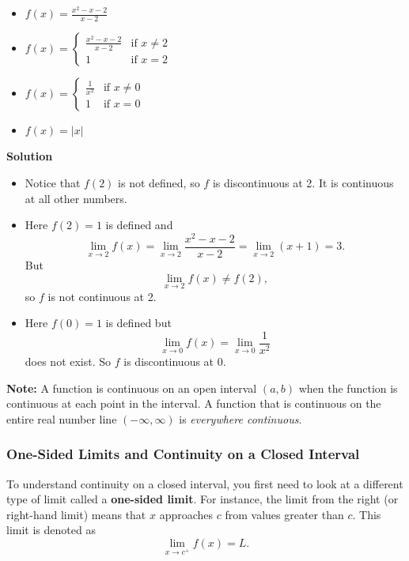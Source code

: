 \documentclass[12pt]{article}
\theoremstyle{beautifulthm}
\begin{document}
\begin{tcolorbox}[colback=examplebg, colframe=red!75!black, title=\textbf{EXAMPLE 1:Where are each of the following functions discontinuous?}, fonttitle=\bfseries, sharp corners]
\begin{itemize}
    \item[(a)] \( f(x) = \frac{x^2 - x - 2}{x - 2} \)
    \item[(b)] \( f(x) = \begin{cases} 
    \frac{x^2 - x - 2}{x - 2} & \text{if } x \neq 2 \\
    1 & \text{if } x = 2 
    \end{cases} \)
    \item[(c)] \( f(x) = \begin{cases} 
    \frac{1}{x^2} & \text{if } x \neq 0 \\
    1 & \text{if } x = 0 
    \end{cases} \)
    \item[(d)] \( f(x) = |x| \)
\end{itemize}

\tcblower
\textbf{Solution} \\
\begin{itemize}
    \item[(a)] Notice that \( f(2) \) is not defined, so \( f \) is discontinuous at 2. It is continuous at all other numbers.
    \item[(b)] Here \( f(2) = 1 \) is defined and
    \[
    \lim_{x \to 2} f(x) = \lim_{x \to 2} \frac{x^2 - x - 2}{x - 2} = \lim_{x \to 2} (x + 1) = 3.
    \]
    But
    \[
    \lim_{x \to 2} f(x) \neq f(2),
    \]
    so \( f \) is not continuous at 2.
    \item[(c)] Here \( f(0) = 1 \) is defined but
    \[
    \lim_{x \to 0} f(x) = \lim_{x \to 0} \frac{1}{x^2}
    \]
    does not exist. So \( f \) is discontinuous at 0.
\end{itemize}
\end{tcolorbox}
\textbf{Note:} A function is continuous on an open interval \((a, b)\) when the function is continuous at each point in the interval. A function that is continuous on the entire real number line \((- \infty, \infty)\) is \textit{everywhere continuous}.

\subsubsection{One-Sided Limits and Continuity on a Closed Interval}
To understand continuity on a closed interval, you first need to look at a different type of limit called a \textbf{one-sided limit}. For instance, the limit from the right (or right-hand limit) means that \( x \) approaches \( c \) from values greater than \( c \). This limit is denoted as
\[
\lim_{x \to c^+} f(x) = L.   
\]
\end{document}
